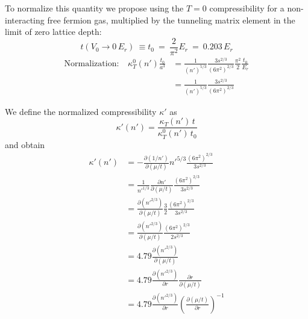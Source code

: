 \documentclass[11pt,letter]{article}
\begin{document}
To normalize this quantity we propose using the $T=0$ compressibility for a
non-interacting free fermion gas, multiplied by the tunneling matrix element
in the limit of zero lattice depth: 
\begin{equation}
  t(V_{0} \rightarrow 0\,E_{r} ) ~ \equiv t_{0} ~ = ~ 
   \frac{2}{\pi^{2}} E_{r} ~  =  ~ 0.203 \, E_{r} 
\end{equation} 
\begin{equation}
\begin{split} 
 \mathrm{Normalization:} ~~~~ 
   \kappa_{T}^{0}(n') \frac{t_{0}}{a^{3}}  & = 
   \frac{1}{ (n')^{5/3}}  \frac{ 3 s^{2/3} }{ (6\pi^{2})^{2/3}} 
   \frac{\pi^{2}}{2}  \frac{ t_{0}}{E_{r}}  \\ 
  & =  \frac{1}{ (n')^{5/3}}  \frac{ 3 s^{2/3} }{ (6\pi^{2})^{2/3}} 
\end{split} 
\end{equation}

We define the normalized compressibility $\kappa'$ as 
\begin{equation} 
 \kappa'(n') = \frac{ \kappa_{T}(n') \, t }{ \kappa_{T}^{0}(n') \, t_{0} } 
\end{equation} 
and obtain
\begin{equation}
\begin{split}
 \kappa'(n') &  = - \frac{ \partial (1/n') }{ \partial (\mu/t)}
   n'^{5/3}\frac{  (6\pi^{2})^{2/3} }{ 3s^{2/3} } \\
    & =  \frac{1}{n'^{1/3}} \frac{ \partial n' }{\partial(\mu/t)}  
         \frac{  (6\pi^{2})^{2/3} }{ 3s^{2/3} } \\
         &  =  \frac{ \partial ( n'^{2/3} ) }{ \partial (\mu/t) } 
    \frac{3}{2} 
         \frac{  (6\pi^{2})^{2/3} }{ 3s^{2/3} } \\
         &  =  \frac{ \partial ( n'^{2/3} ) }{ \partial (\mu/t) } 
         \frac{  (6\pi^{2})^{2/3} }{ 2s^{2/3} } \\
         &  =  4.79 \frac{ \partial ( n'^{2/3} ) }{ \partial (\mu/t) } \\ 
         &  =  4.79 \frac{ \partial ( n'^{2/3} ) }{\partial r} 
         \frac{ \partial r }{ \partial (\mu/t) } \\
         &  =  4.79 \frac{ \partial ( n'^{2/3} ) }{\partial r} 
         \left( \frac{ \partial (\mu/t) }{ \partial r } \right)^{-1} \\
\end{split}
\end{equation} 
    




 

 

\end{document}
